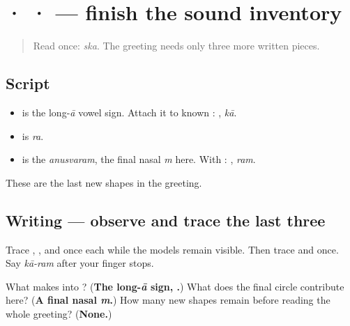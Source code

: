 \section[\texorpdfstring{\ml{ാ} \ml{ര} \ml{ം} (long ā, ra, final m)}{ാ ര ം (long ā, ra, final m)}]{ ·  ·  — finish the sound inventory}

\label{lesson:ML-W01-aa-ra-anusvaram}



\begin{quote}
Read \textbf{} once: \emph{ska}. The greeting needs only three more written pieces.
\end{quote}

\subsection*{Script}
\begin{itemize}
\raggedright
  \item \textbf{} is the long-\emph{ā} vowel sign. Attach it to known \textbf{}: \textbf{}, \emph{kā}.
  \item \textbf{} is \emph{ra}.
  \item \textbf{} is the \emph{anusvaram}, the final nasal \emph{m} here. With \textbf{}: \textbf{}, \emph{ram}.
\end{itemize}

These are the last new shapes in the greeting.

\subsection*{Writing — observe and trace the last three}

Trace \textbf{}, \textbf{}, and \textbf{} once each while the models remain visible. Then trace \textbf{} and \textbf{} once. Say \emph{kā-ram} after your finger stops.

\begin{tcolorbox}[breakable,colback=teal!4,colframe=teal!35!black,title={Before you move on}]
What makes \textbf{} into \textbf{}? (\textbf{The long-\emph{ā} sign, .}) What does the final circle \textbf{} contribute here? (\textbf{A final nasal \emph{m}.}) How many new shapes remain before reading the whole greeting? (\textbf{None.})
\end{tcolorbox}
